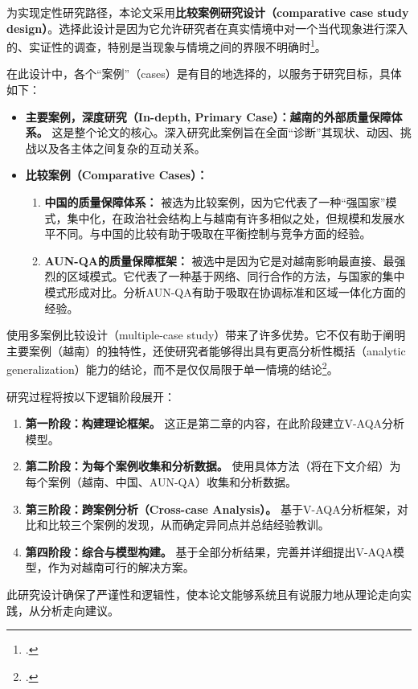 为实现定性研究路径，本论文采用\textbf{比较案例研究设计（comparative case study design）}。选择此设计是因为它允许研究者在真实情境中对一个当代现象进行深入的、实证性的调查，特别是当现象与情境之间的界限不明确时\footcite{Yin2018}。

在此设计中，各个“案例”（cases）是有目的地选择的，以服务于研究目标，具体如下：
\begin{itemize}
    \item \textbf{主要案例，深度研究（In-depth, Primary Case）：越南的外部质量保障体系。} 这是整个论文的核心。深入研究此案例旨在全面“诊断”其现状、动因、挑战以及各主体之间复杂的互动关系。
    
    \item \textbf{比较案例（Comparative Cases）：}
    \begin{enumerate}
        \item \textbf{中国的质量保障体系：} 被选为比较案例，因为它代表了一种“强国家”模式，集中化，在政治社会结构上与越南有许多相似之处，但规模和发展水平不同。与中国的比较有助于吸取在平衡控制与竞争方面的经验。
        \item \textbf{AUN-QA的质量保障框架：} 被选中是因为它是对越南影响最直接、最强烈的区域模式。它代表了一种基于网络、同行合作的方法，与国家的集中模式形成对比。分析AUN-QA有助于吸取在协调标准和区域一体化方面的经验。
    \end{enumerate}
\end{itemize}

使用多案例比较设计（multiple-case study）带来了许多优势。它不仅有助于阐明主要案例（越南）的独特性，还使研究者能够得出具有更高分析性概括（analytic generalization）能力的结论，而不是仅仅局限于单一情境的结论\footcite{Yin2018}。

研究过程将按以下逻辑阶段展开：
\begin{enumerate}
    \item \textbf{第一阶段：构建理论框架。} 这正是第二章的内容，在此阶段建立V-AQA分析模型。
    \item \textbf{第二阶段：为每个案例收集和分析数据。} 使用具体方法（将在下文介绍）为每个案例（越南、中国、AUN-QA）收集和分析数据。
    \item \textbf{第三阶段：跨案例分析（Cross-case Analysis）。} 基于V-AQA分析框架，对比和比较三个案例的发现，从而确定异同点并总结经验教训。
    \item \textbf{第四阶段：综合与模型构建。} 基于全部分析结果，完善并详细提出V-AQA模型，作为对越南可行的解决方案。
\end{enumerate}

此研究设计确保了严谨性和逻辑性，使本论文能够系统且有说服力地从理论走向实践，从分析走向建议。



